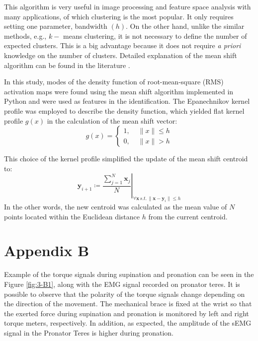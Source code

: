 This algorithm is very useful in image processing and feature space analysis with many applications, of which clustering is the most popular. It only requires setting one parameter, bandwidth $(h)$. On the other hand, unlike the similar methods, e.g., $k-$ means clustering, it is not necessary to define the number of expected clusters. This is a big advantage because it does not require \textit{a priori} knowledge on the number of clusters. Detailed explanation of the mean shift algorithm can be found in the literature \citep{Comaniciu2002, Fukunaga1975}.

In this study, modes of the density function of root-mean-square (RMS) activation maps were found using the mean shift algorithm implemented in Python \citep{scikit-learn} and were used as features in the identification. The Epanechnikov kernel profile was employed to describe the density function, which yielded flat kernel profile $g(x)$ in the calculation of the mean shift vector:
\begin{equation} \label{eq:3-A14}
g (x) = \left\{\begin{array}{lr} 1, & \,\, \parallel x \parallel \leq h \\
0,  & \,\,\parallel x \parallel > h \end{array}\right.
\end{equation}

This choice of the kernel profile simplified the update of the mean shift centroid to:
\begin{equation} \label{eq:3-A15}
\left. \mathbf{y}_{i+1} \coloneqq \frac{\sum_{j=1}^{N} \mathbf{x}_j}{N} \right\vert_{\forall \mathbf{x} \,s.t. \,\parallel \mathbf{x}-\mathbf{y}_i \parallel \leq h}
\end{equation}
In the other words, the new centroid was calculated as the mean value of $N$ points located within the Euclidean distance $h$ from the current centroid.
\clearpage


\section{Appendix B}\label{Apx B}
Example of the torque signals during supination and pronation can be seen in the Figure \ref{fig:3-B1}, along with the EMG signal recorded on pronator teres. It is possible to observe that the polarity of the torque signals change depending on the direction of the movement. The mechanical brace is fixed at the wrist so that the exerted force during supination and pronation is monitored by left and right torque meters, respectively. In addition, as expected, the amplitude of the sEMG signal in the Pronator Teres is higher during pronation.

